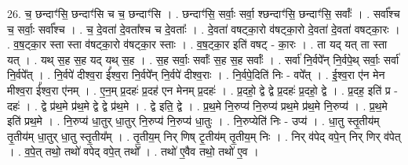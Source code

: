 \documentclass[17pt]{extarticle}
\begin{document}
26. च॒ छन्दाꣳ॑सि॒ छन्दाꣳ॑सि च च॒ छन्दाꣳ॑सि । . छन्दाꣳ॑सि॒ सर्वाः॒ सर्वा॒ श्छन्दाꣳ॑सि॒ छन्दाꣳ॑सि॒ सर्वाः᳚ । . सर्वा᳚श्च च॒ सर्वाः॒ सर्वा᳚श्च । . च॒ दे॒वता॑ दे॒वता᳚श्च च दे॒वताः᳚ । . दे॒वता॑ वषट्का॒रो व॑षट्का॒रो दे॒वता॑ दे॒वता॑ वषट्का॒रः । . व॒ष॒ट्का॒र स्ता स्ता व॑षट्का॒रो व॑षट्का॒र स्ताः । . व॒ष॒ट्का॒र इति॑ वषट् - का॒रः । . ता यद् यत् ता स्ता यत् । . यथ् स॒ह स॒ह यद् यथ् स॒ह । . स॒ह सर्वाः॒ सर्वाः᳚ स॒ह स॒ह सर्वाः᳚ । . सर्वा॑ नि॒र्वपे᳚न् नि॒र्वपे॒थ् सर्वाः॒ सर्वा॑ नि॒र्वपे᳚त् । . नि॒र्वपे॑ दीश्व॒रा ई᳚श्व॒रा नि॒र्वपे᳚न् नि॒र्वपे॑ दीश्व॒राः । . नि॒र्वपे॒दिति॑ निः - वपे᳚त् । . ई॒श्व॒रा ए॑न मेन मीश्व॒रा ई᳚श्व॒रा ए॑नम् । . ए॒न॒म् प्र॒दहः॑ प्र॒दह॑ एन मेनम् प्र॒दहः॑ । . प्र॒दहो॒ द्वे द्वे प्र॒दहः॑ प्र॒दहो॒ द्वे । . प्र॒दह॒ इति॑ प्र - दहः॑ । . द्वे प्र॑थ॒मे प्र॑थ॒मे द्वे द्वे प्र॑थ॒मे । . द्वे इति॒ द्वे । . प्र॒थ॒मे नि॒रुप्य॑ नि॒रुप्य॑ प्रथ॒मे प्र॑थ॒मे नि॒रुप्य॑ । . प्र॒थ॒मे इति॑ प्रथ॒मे । . नि॒रुप्य॑ धा॒तुर् धा॒तुर् नि॒रुप्य॑ नि॒रुप्य॑ धा॒तुः । . नि॒रुप्येति॑ निः - उप्य॑ । . धा॒तु स्तृ॒तीय॑म् तृ॒तीय॑म् धा॒तुर् धा॒तु स्तृ॒तीय᳚म् । . तृ॒तीय॒म् निर् णिष् टृ॒तीय॑म् तृ॒तीय॒म् निः । . निर् व॑पेद् वपे॒न् निर् णिर् व॑पेत् । . व॒पे॒त् तथो॒ तथो॑ वपेद् वपे॒त् तथो᳚ । . तथो॑ ए॒वैव तथो॒ तथो॑ ए॒व । \newline
\end{document}
